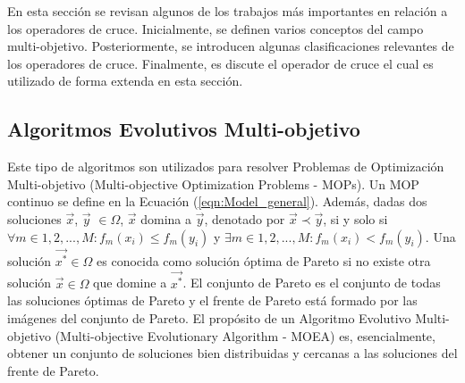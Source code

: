 En esta sección se revisan algunos de los trabajos más importantes en relación a los operadores de cruce.
%
%
Inicialmente, se definen varios conceptos del campo multi-objetivo.
%
Posteriormente, se introducen algunas clasificaciones relevantes de los operadores de cruce.
%
Finalmente, es discute el operador de cruce \SBX{} el cual es utilizado de forma extenda en esta sección.

\subsection{Algoritmos Evolutivos Multi-objetivo}

Este tipo de algoritmos son utilizados para resolver Problemas de Optimización Multi-objetivo (Multi-objective Optimization Problems - MOPs).
%
Un MOP continuo se define en la Ecuación (\ref{eqn:Model_general}).
%
Además, dadas dos soluciones $\vec{x}$, $\vec{y}$ $\in \Omega$, $\vec{x}$ domina a $\vec{y}$, denotado por $\vec{x} \prec \vec{y}$, si y solo si $\forall m \in {1,2,...,M} : f_m(x_i) \leq f_m(y_i)$ y $\exists m \in {1,2,...,M} : f_m(x_i) < f_m(y_i)$.
%
Una solución $\vec{x^*} \in \Omega$ es conocida como solución óptima de Pareto si no existe otra solución $\vec{x} \in \Omega$ que domine a $\vec{x^*}$.
%
El conjunto de Pareto es el conjunto de todas las soluciones óptimas de Pareto y el frente de Pareto está formado por las imágenes del conjunto de Pareto.
%
El propósito de un Algoritmo Evolutivo Multi-objetivo (Multi-objective Evolutionary Algorithm - MOEA) es, esencialmente, obtener un conjunto de soluciones bien distribuidas y cercanas a las soluciones del frente de Pareto.
%


